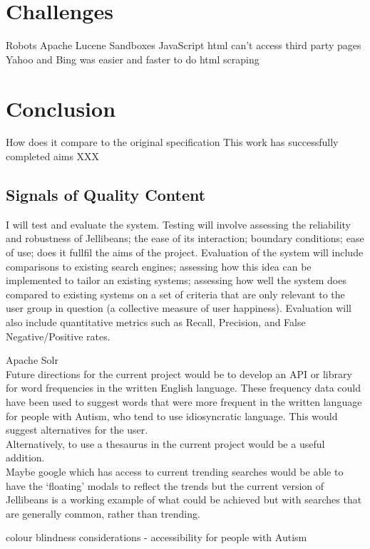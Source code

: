 \documentclass[a4paper, 11pt]{article}
\begin{document}
\section{Challenges}
Robots
Apache Lucene
Sandboxes
JavaScript html can't access third party pages
Yahoo and Bing was easier and faster to do html scraping


\section{Conclusion}
How does it compare to the original specification
This work has successfully completed aims XXX

\subsection{Signals of Quality Content}
I will test and evaluate the system. Testing will involve assessing the reliability and robustness of Jellibeans; the ease of its interaction; boundary conditions; ease of use; does it fullfil the aims of the project.
Evaluation of the system will include comparisons to existing search engines; assessing how this idea can be implemented to tailor an existing systems; assessing how well the system does compared to existing systems on a set of criteria that are only relevant to the user group in question (a collective measure of user happiness). Evaluation will also include quantitative metrics such as Recall, Precision, and False Negative/Positive rates.


Apache Solr\\

Future directions for the current project would be to develop an API or library for word frequencies in the written English language. These frequency data could have been used to suggest words that were more frequent in the written language for people with Autism, who tend to use idiosyncratic language. This would suggest alternatives for the user.\\

Alternatively, to use a thesaurus in the current project would be a useful addition.\\

Maybe google which has access to current trending searches would be able to have the `floating' modals to reflect the trends but the current version of Jellibeans is a working example of what could be achieved but with searches that are generally common, rather than trending.

colour blindness considerations - accessibility for people with Autism  
\end{document}

